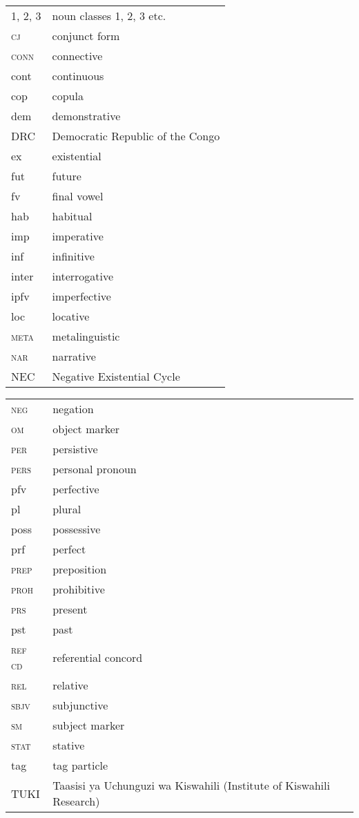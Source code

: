 \documentclass[output=paper,draft,draftmode,colorlinks,citecolor=brown]{langscibook}
\begin{document}
\noindent%
\begin{minipage}{\textwidth}
    \begin{tabularx}{.45\textwidth}[t]{@{} l Q }
1, 2, 3 & noun classes 1, 2, 3 etc.\\ 
\textsc{cj} & conjunct form\\
\textsc{conn}   & connective\\
{\sc cont}&	continuous\\
{\sc cop}&	copula\\
{\sc dem}&	demonstrative\\
{\sc DRC}&	Democratic Republic of the Congo\\
{\sc ex}&	existential\\
{\sc fut}&	future\\
{\sc fv}&	final vowel\\
{\sc hab}&	habitual\\
{\sc imp}&	imperative\\
{\sc inf}&	infinitive\\
{\sc inter}&	interrogative\\
{\sc ipfv}&	imperfective\\
{\sc loc}&	locative\\
\textsc{meta} & metalinguistic\\ 
\textsc{nar}&narrative\\
\textsc{NEC}&Negative Existential Cycle\\
\end{tabularx}
\begin{tabularx}{.45\textwidth}[t]{ l Q @{}}
\textsc{neg}&negation\\
\textsc{om}&object marker\\
\textsc{per}    &persistive\\
\textsc{pers}   &personal pronoun\\
{\sc pfv}&	perfective\\
{\sc pl}&	plural\\
{\sc poss}&	possessive\\
{\sc prf}&	perfect\\
\textsc{prep}&	preposition\\
\textsc{proh}&		prohibitive\\
\textsc{prs}&		present\\
{\sc pst}&	past\\
\textsc{ref cd}&		referential concord\\
\textsc{rel}&		relative\\
\textsc{sbjv}&		subjunctive\\
\textsc{sm}&	subject marker\\
\textsc{stat}   &stative\\
{\sc tag}&	tag particle\\
\textsc{TUKI}&Taasisi ya Uchunguzi wa Kiswahili (Institute of Kiswahili Research)\\
\end{tabularx}
\end{minipage}
\end{document}
